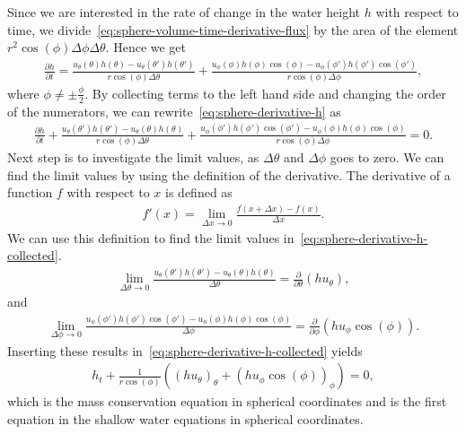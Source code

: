 Since we are interested in the rate of change in the water height $h$ with respect to time, we divide~\eqref{eq:sphere-volume-time-derivative-flux} by the area of the element $r^2 \cos(\phi) \Delta \phi \Delta \theta$.
Hence we get
\begin{align}\label{eq:sphere-derivative-h}
    \frac{\partial h}{\partial t} = \frac{u_\theta(\theta) h(\theta) - u_\theta(\theta ')h(\theta ') }{r \cos(\phi) \Delta \theta} 
    + \frac{u_\phi(\phi) h(\phi)\cos (\phi) - u_\phi (\phi ')h(\phi ') \cos(\phi')}{r \cos (\phi) \Delta \phi},
\end{align}
where $\phi \neq \pm \frac{\phi}{2}$.
By collecting terms to the left hand side and changing the order of the numerators, we can rewrite~\eqref{eq:sphere-derivative-h} as 
\begin{align}\label{eq:sphere-derivative-h-collected}
    \frac{\partial h}{\partial t} + \frac{u_\theta(\theta') h(\theta') - u_\theta(\theta)h(\theta) }{r \cos(\phi) \Delta \theta} 
    + \frac{u_\phi(\phi ')h(\phi ') \cos(\phi') - u_\phi(\phi) h(\phi) \cos(\phi) }{r \cos (\phi) \Delta \phi} = 0.
\end{align}
Next step is to investigate the limit values, as $\Delta \theta$ and $\Delta \phi$ goes to zero.
We can find the limit values by using the definition of the derivative.
The derivative of a function $f$ with respect to $x$ is defined as
\begin{align*}
    f'(x) = \lim_{\Delta x \to 0} \frac{f(x + \Delta x) - f(x)}{\Delta x}.
\end{align*}
We can use this definition to find the limit values in~\eqref{eq:sphere-derivative-h-collected}.
\begin{align*}
    \lim_{\Delta \theta \to 0} \frac{ u_\theta(\theta ')h(\theta ') - u_\theta(\theta) h(\theta) }{\Delta \theta} = \frac{\partial}{\partial \theta} (h u_\theta ),
\end{align*}
and 
\begin{align*}
    \lim_{\Delta \phi \to 0} \frac{ u_\phi(\phi ')h(\phi ') \cos(\phi') - u_\phi(\phi) h(\phi) \cos(\phi) }{\Delta \phi} =  \frac{\partial}{\partial \phi} (h u_\phi \cos(\phi)).
\end{align*}
Inserting these results in~\eqref{eq:sphere-derivative-h-collected} yields
\begin{align*}
    h_t + \frac{1}{r \cos (\phi)} \left( {(h u_\theta)}_{\theta} + {(h u_{\phi} \cos(\phi))}_{\phi}  \right) = 0,
\end{align*}
which is the mass conservation equation in spherical coordinates and is the first equation in the shallow water equations in spherical coordinates.
